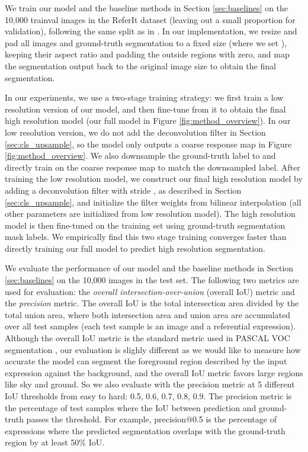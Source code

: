 \documentclass[runningheads]{llncs}
\begin{document}
We train our model and the baseline methods in Section \ref{sec:baselines} on the 10,000 trainval images in the ReferIt dataset \cite{kazemzadeh2014referitgame} (leaving out a small proportion for validation), following the same split as in \cite{hu2015natural}. In our implementation, we resize and pad all images and ground-truth segmentation to a fixed size  (where we set ), keeping their aspect ratio and padding the outside regions with zero, and map the segmentation output back to the original image size to obtain the final segmentation.

In our experiments, we use a two-stage training strategy: we first train a low resolution version of our model, and then fine-tune from it to obtain the final high resolution model (\ie our full model in Figure \ref{fig:method_overview}). In our low resolution version, we do not add the deconvolution filter in Section \ref{sec:cls_upsample}, so the model only outputs a  coarse response map in Figure \ref{fig:method_overview}. We also downsample the ground-truth label to  and directly train on the coarse response map to match the downsampled label. After training the low resolution model, we construct our final high resolution model by adding a  deconvolution filter with stride , as described in Section \ref{sec:cls_upsample}, and initialize the filter weights from bilinear interpolation (all other parameters are initialized from low resolution model). The high resolution model is then fine-tuned on the training set using  ground-truth segmentation mask labels. We empirically find this two stage training converges faster than directly training our full model to predict  high resolution segmentation.

We evaluate the performance of our model and the baseline methods in Section \ref{sec:baselines} on the 10,000 images in the test set. The following two metrics are used for evaluation: the \textit{overall intersection-over-union} (overall IoU) metric and the \textit{precision} metric. The overall IoU is the total intersection area divided by the total union area, where both intersection area and union area are accumulated over all test samples (each test sample is an image and a referential expression). Although the overall IoU metric is the standard metric used in PASCAL VOC segmentation \cite{hu2015natural}, our evaluation is slighly different as we would like to measure how accurate the model can segment the foreground region described by the input expression against the background, and the overall IoU metric favors large regions like sky and ground. So we also evaluate with the precision metric at 5 different IoU thresholds from easy to hard: 0.5, 0.6, 0.7, 0.8, 0.9. The precision metric is the percentage of test samples where the IoU between prediction and ground-truth passes the threshold. For example, precision@0.5 is the percentage of expressions where the predicted segmentation overlaps with the ground-truth region by at least 50\% IoU.
\end{document}
